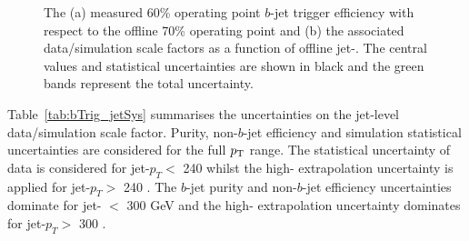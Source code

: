 \begin{figure}[!ht]
  \begin{center}
    \captionsetup[subfigure]{aboveskip=0pt,justification=centering}
     \hspace{-5mm}

  \end{center}
\vspace{-1em}
  \caption[
    The $b$-jet trigger efficiency measured in data and the associated data/simulation scale factors as a function of offline jet-\pT.]
          {\label{fig:bTrig_jetSys}
    The (a) measured 60\% operating point $b$-jet trigger efficiency with respect to the offline 70\% operating point
    and (b) the associated data/simulation scale factors as a function of offline jet-\pT.
    The central values and statistical uncertainties are shown in black and the green bands represent the total uncertainty.}
\end{figure}


Table~\ref{tab:bTrig_jetSys} summarises the uncertainties on the jet-level data/simulation scale factor.
Purity, non-$b$-jet efficiency and simulation statistical uncertainties are considered for the full $p_{\mathrm{T}}$ range.
The statistical uncertainty of data is considered for jet-$p_T <$ 240 \GeV{}
whilst the high-\pT{} extrapolation uncertainty is applied for jet-$p_T >$ 240 \GeV.
The $b$-jet purity and non-$b$-jet efficiency uncertainties dominate for jet-\pT{} $<$ 300 GeV and the high-\pT{} extrapolation uncertainty dominates for jet-$p_T >$ 300 \GeV.

